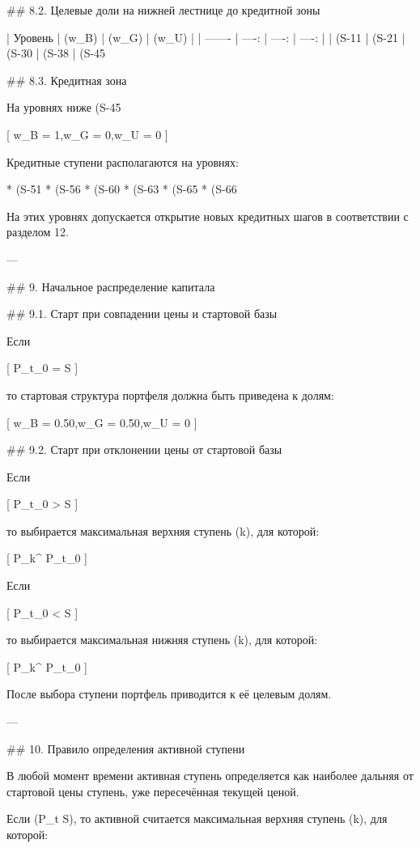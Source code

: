 ## 8.2. Целевые доли на нижней лестнице до кредитной зоны

| Уровень | (w_B) | (w_G) | (w_U) |
| ------- | ----: | ----: | ----: |
| (S-11%
| (S-21%
| (S-30%
| (S-38%
| (S-45%

## 8.3. Кредитная зона

На уровнях ниже (S-45%

[
w_B = 1,\qquad w_G = 0,\qquad w_U = 0
]

Кредитные ступени располагаются на уровнях:

* (S-51%
* (S-56%
* (S-60%
* (S-63%
* (S-65%
* (S-66%

На этих уровнях допускается открытие новых кредитных шагов в соответствии с разделом 12.

---

## 9. Начальное распределение капитала

## 9.1. Старт при совпадении цены и стартовой базы

Если

[
P_{t_0} = S
]

то стартовая структура портфеля должна быть приведена к долям:

[
w_B = 0.50,\qquad w_G = 0.50,\qquad w_U = 0
]

## 9.2. Старт при отклонении цены от стартовой базы

Если

[
P_{t_0} > S
]

то выбирается максимальная верхняя ступень (k), для которой:

[
P_k^{\uparrow} \le P_{t_0}
]

Если

[
P_{t_0} < S
]

то выбирается максимальная нижняя ступень (k), для которой:

[
P_k^{\downarrow} \ge P_{t_0}
]

После выбора ступени портфель приводится к её целевым долям.

---

## 10. Правило определения активной ступени

В любой момент времени активная ступень определяется как наиболее дальняя от стартовой цены ступень, уже пересечённая текущей ценой.

Если (P_t \ge S), то активной считается максимальная верхняя ступень (k), для которой:

